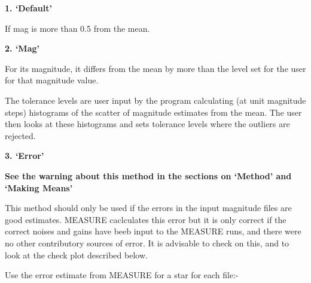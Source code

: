\begin{small}
{{{ {\vspace*{2mm} \bf 1. \hspace{4ex} `Default'  \vspace*{2mm}}

   If mag is more than 0.5 from the mean.

 {\vspace*{2mm} \bf 2. \hspace{4ex} `Mag'  \vspace*{2mm}}

   For its magnitude, it differs from the mean by more than
   the level set for the user for that magnitude value.

              The tolerance levels are user input by the program
              calculating (at unit magnitude steps) histograms  of the
              scatter of magnitude estimates from the mean. The user
              then looks at these histograms and sets tolerance levels
              where the outliers are rejected.

 {\vspace*{2mm} \bf 3. \hspace{4ex} `Error'  \vspace*{2mm}}

{\bf See the warning about this method in the sections on `Method'
     and `Making Means'}

      This method should only be used if the errors in the input
      magnitude files are good estimates. MEASURE caclculates this
      error but it is only correct if the correct noises and gains
      have beeb input to the MEASURE runs, and there were no other
      contributory sources of error. It is advisable to check on
      this, and to look at the check plot described below.

              Use the error estimate from MEASURE for a star for each
              file:-

}}}
\end{small}
